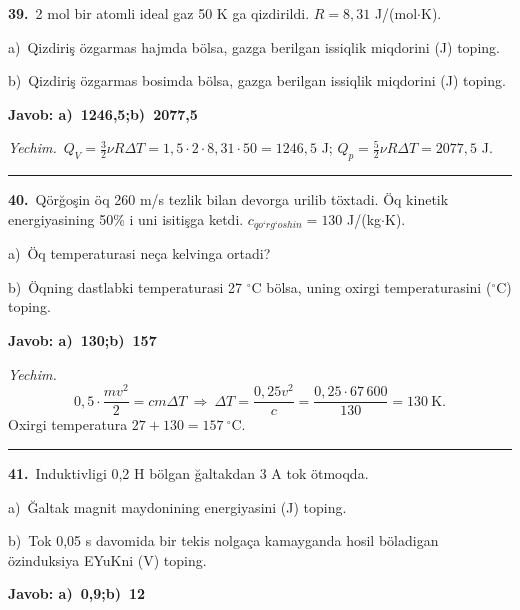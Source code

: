 \documentclass[11pt,a4paper]{article}
\begin{document}
\noindent\textbf{39.}\ 2 mol bir atomli ideal gaz 50 K ga qizdirildi. $R=8{,}31$ J/(mol$\cdot$K).\par
\noindent\hspace*{4mm}a)\ Qizdiriş özgarmas hajmda bölsa, gazga berilgan issiqlik miqdorini (J) toping.\par
\noindent\hspace*{4mm}b)\ Qizdiriş özgarmas bosimda bölsa, gazga berilgan issiqlik miqdorini (J) toping.\par
\noindent\colorbox{gray!12}{\parbox{\dimexpr\linewidth-2\fboxsep}{\textbf{Javob: a)\ 1246,5;\quad b)\ 2077,5}}}\par\smallskip
\noindent\textit{Yechim.}\ $Q_V=\frac32\nu R\Delta T=1{,}5\cdot2\cdot8{,}31\cdot50=1246{,}5$ J; $Q_p=\frac52\nu R\Delta T=2077{,}5$ J.\par\par\medskip\hrule\medskip
{}\noindent\textbf{40.}\ Qörğoşin öq 260 m/s tezlik bilan devorga urilib töxtadi. Öq kinetik energiyasining 50\% i uni isitişga ketdi. $c_{qo‘rg‘oshin}=130$ J/(kg$\cdot$K).\par
\noindent\hspace*{4mm}a)\ Öq temperaturasi neça kelvinga ortadi?\par
\noindent\hspace*{4mm}b)\ Öqning dastlabki temperaturasi 27 $^\circ$C bölsa, uning oxirgi temperaturasini ($^\circ$C) toping.\par
\noindent\colorbox{gray!12}{\parbox{\dimexpr\linewidth-2\fboxsep}{\textbf{Javob: a)\ 130;\quad b)\ 157}}}\par\smallskip
\noindent\textit{Yechim.}\ \[0{,}5\cdot\frac{mv^2}{2}=cm\Delta T\ \Rightarrow\ \Delta T=\frac{0{,}25v^2}{c}=\frac{0{,}25\cdot67\,600}{130}=130\ \text{K}.\]
Oxirgi temperatura $27+130=157\ ^\circ$C.\par\par\medskip\hrule\medskip
{}\noindent\textbf{41.}\ Induktivligi 0,2 H bölgan ğaltakdan 3 A tok ötmoqda.\par
\noindent\hspace*{4mm}a)\ Ğaltak magnit maydonining energiyasini (J) toping.\par
\noindent\hspace*{4mm}b)\ Tok 0,05 s davomida bir tekis nolgaça kamayganda hosil böladigan özinduksiya EYuKni (V) toping.\par
\noindent\colorbox{gray!12}{\parbox{\dimexpr\linewidth-2\fboxsep}{\textbf{Javob: a)\ 0,9;\quad b)\ 12}}}\par\smallskip
\end{document}
